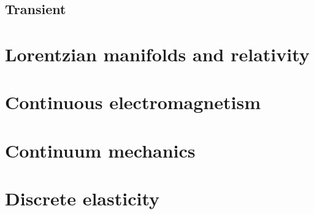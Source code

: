 \documentclass{article}
\theoremstyle{definition}
\begin{document}
\subsection{Transient}























\newpage

\section{Lorentzian manifolds and relativity}
\label{section:lorentzian_manifolds_and_relativity}
\phantom{T}


\section{Continuous electromagnetism}
\label{section:continuous_electromagnetism}
\phantom{T}








\section{Continuum mechanics}
\label{section:continuum_mechanics}
\phantom{T}


\section{Discrete elasticity}
\label{section:discrete_elasticity}
\phantom{T}


\end{document}
